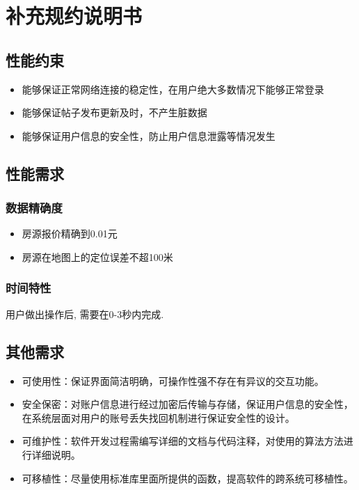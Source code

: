 
\chapter{补充规约说明书}

\section{性能约束}
\begin{itemize}
    \item 能够保证正常网络连接的稳定性，在用户绝大多数情况下能够正常登录
    \item 能够保证帖子发布更新及时，不产生脏数据
    \item 能够保证用户信息的安全性，防止用户信息泄露等情况发生
\end{itemize}
\section{性能需求}
 
\subsection{数据精确度}
\begin{itemize}
    \item 房源报价精确到0.01元
    \item 房源在地图上的定位误差不超100米
\end{itemize}

\subsection{时间特性}
用户做出操作后, 需要在0-3秒内完成.
\section{其他需求}

\begin{itemize}
    \item 可使用性：保证界面简洁明确，可操作性强不存在有异议的交互功能。
    \item 安全保密：对账户信息进行经过加密后传输与存储，保证用户信息的安全性，在系统层面对用户的账号丢失找回机制进行保证安全性的设计。
    \item 可维护性：软件开发过程需编写详细的文档与代码注释，对使用的算法方法进行详细说明。
    \item 可移植性：尽量使用标准库里面所提供的函数，提高软件的跨系统可移植性。
    \end{itemize}
